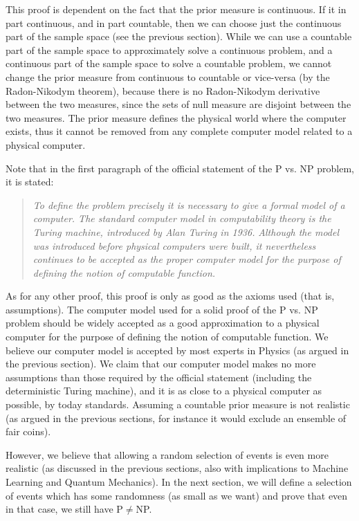 \documentclass[11pt]{book}
\begin{document}
This proof is dependent on the fact that the prior measure is
continuous. If it in part continuous, and in part countable, then we can
choose just the continuous part of the sample space (see the previous
section). While we can use a countable part of the sample space to
approximately solve a continuous problem, and a continuous part of the
sample space to solve a countable problem, we cannot change the prior
measure from continuous to countable or vice-versa (by the Radon-Nikodym
theorem), because there is no Radon-Nikodym derivative between the two
measures, since the sets of null measure are disjoint between the two
measures. The prior measure defines the physical world where the
computer exists, thus it cannot be removed from any complete computer
model related to a physical computer.

Note that in the first paragraph of the official statement of the P vs.
NP problem\cite{pvsnp}, it is stated:

\begin{quote}
\emph{To define the problem precisely it is necessary to give a formal
model of a computer. The standard computer model in computability theory
is the Turing machine, introduced by Alan Turing in 1936.}
\emph{Although the model was introduced before physical computers were
built, it nevertheless continues to be accepted as the proper computer
model for the purpose of defining the notion of computable function.}
\end{quote}

As for any other proof, this proof is only as good as the axioms used
(that is, assumptions). The computer model used for a solid proof of the
P vs. NP problem should be widely accepted as a good approximation to a
physical computer for the purpose of defining the notion of computable
function. We believe our computer model is accepted by most experts in
Physics (as argued in the previous section). We claim that our computer
model makes no more assumptions than those required by the official
statement\cite{pvsnp} (including the
deterministic Turing machine), and it is as close to a physical computer
as possible, by today standards. Assuming a countable prior measure is
not realistic (as argued in the previous sections, for instance it would
exclude an ensemble of fair coins).

However, we believe that allowing a random selection of events is even
more realistic (as discussed in the previous sections, also with
implications to Machine Learning and Quantum Mechanics). In the next
section, we will define a selection of events which has some randomness
(as small as we want) and prove that even in that case, we still have
P\(\neq\)NP.
\end{document}
